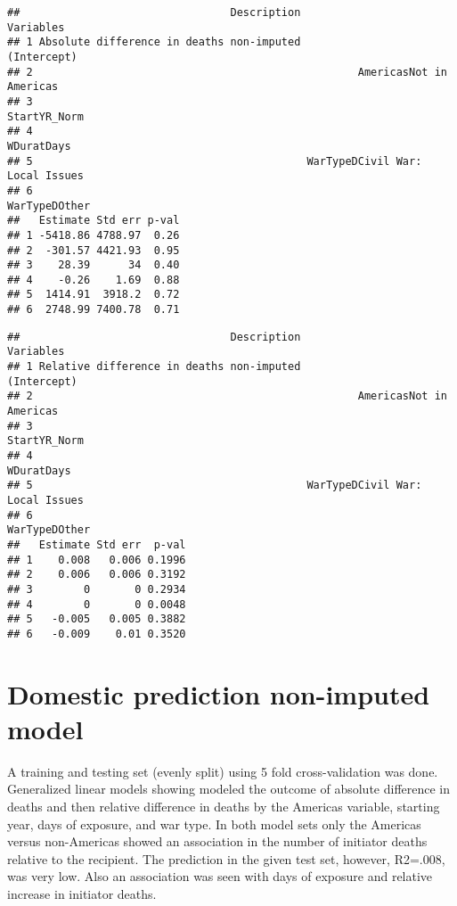\documentclass[
]{article}
\begin{document}
\begin{verbatim}
##                                 Description                       Variables
## 1 Absolute difference in deaths non-imputed                     (Intercept)
## 2                                                   AmericasNot in Americas
## 3                                                              StartYR_Norm
## 4                                                                WDuratDays
## 5                                           WarTypeDCivil War: Local Issues
## 6                                                             WarTypeDOther
##   Estimate Std err p-val
## 1 -5418.86 4788.97  0.26
## 2  -301.57 4421.93  0.95
## 3    28.39      34  0.40
## 4    -0.26    1.69  0.88
## 5  1414.91  3918.2  0.72
## 6  2748.99 7400.78  0.71
\end{verbatim}

\begin{verbatim}
##                                 Description                       Variables
## 1 Relative difference in deaths non-imputed                     (Intercept)
## 2                                                   AmericasNot in Americas
## 3                                                              StartYR_Norm
## 4                                                                WDuratDays
## 5                                           WarTypeDCivil War: Local Issues
## 6                                                             WarTypeDOther
##   Estimate Std err  p-val
## 1    0.008   0.006 0.1996
## 2    0.006   0.006 0.3192
## 3        0       0 0.2934
## 4        0       0 0.0048
## 5   -0.005   0.005 0.3882
## 6   -0.009    0.01 0.3520
\end{verbatim}

\hypertarget{domestic-prediction-non-imputed-model}{%
\section{Domestic prediction non-imputed
model}\label{domestic-prediction-non-imputed-model}}

A training and testing set (evenly split) using 5 fold cross-validation
was done. Generalized linear models showing modeled the outcome of
absolute difference in deaths and then relative difference in deaths by
the Americas variable, starting year, days of exposure, and war type. In
both model sets only the Americas versus non-Americas showed an
association in the number of initiator deaths relative to the recipient.
The prediction in the given test set, however, R2=.008, was very low.
Also an association was seen with days of exposure and relative increase
in initiator deaths.
\end{document}

